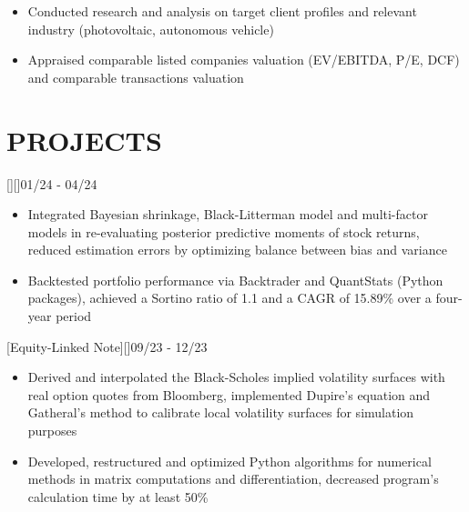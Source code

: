 \documentclass[cmu]{resume}
\begin{document}
    \begin{itemize}
        \item Conducted research and analysis on target client profiles and relevant industry (photovoltaic, autonomous vehicle)
        \item Appraised comparable listed companies valuation (EV/EBITDA, P/E, DCF) and comparable transactions valuation
    \end{itemize}
    \section{PROJECTS}
    [][]{01/24 - 04/24}
    \begin{itemize}
        \item Integrated Bayesian shrinkage, Black-Litterman model and multi-factor models in re-evaluating posterior predictive moments of stock returns, reduced estimation errors by optimizing balance between bias and variance
        \item Backtested portfolio performance via Backtrader and QuantStats (Python packages), achieved a Sortino ratio of 1.1 and a CAGR of 15.89\% over a four-year period
    \end{itemize}

    [Equity-Linked Note][]{09/23 - 12/23}
    \begin{itemize}
        \item Derived and interpolated the Black-Scholes implied volatility surfaces with real option quotes from Bloomberg, implemented Dupire's equation and Gatheral's method to calibrate local volatility surfaces for simulation purposes
        \item Developed, restructured and optimized Python algorithms for numerical methods in matrix computations and differentiation, decreased program's calculation time by at least 50\%
    \end{itemize}
\end{document}
